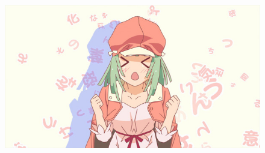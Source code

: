 \documentclass[A4 paper, 12pt, oneside, landscape]{article}
\begin{document}
    \begin{figure}
        \centering
        \includegraphics{renai.png}
    \end{figure}
\end{document}
